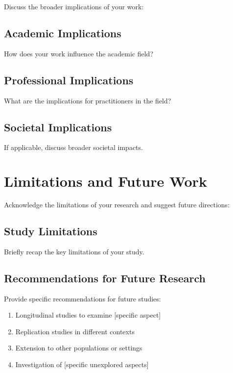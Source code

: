 Discuss the broader implications of your work:

\subsection{Academic Implications}

How does your work influence the academic field?

\subsection{Professional Implications}

What are the implications for practitioners in the field?

\subsection{Societal Implications}

If applicable, discuss broader societal impacts.

\section{Limitations and Future Work}

Acknowledge the limitations of your research and suggest future directions:

\subsection{Study Limitations}

Briefly recap the key limitations of your study.

\subsection{Recommendations for Future Research}

Provide specific recommendations for future studies:

\begin{enumerate}
    \item Longitudinal studies to examine [specific aspect]
    \item Replication studies in different contexts
    \item Extension to other populations or settings
    \item Investigation of [specific unexplored aspects]
\end{enumerate}

